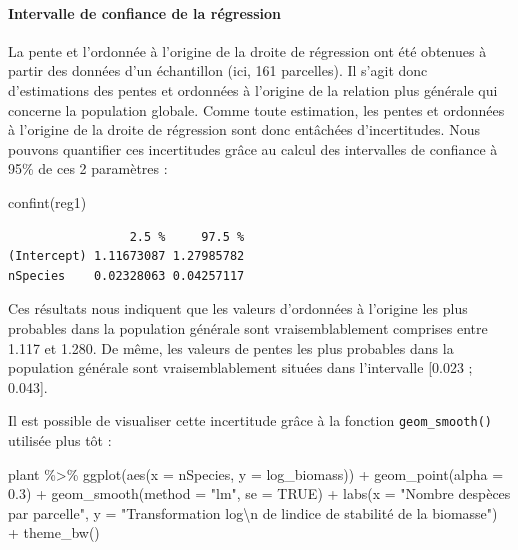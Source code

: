 \documentclass[
  a4paper,
]{article}
\newenvironment{Shaded}{\begin{snugshade}}{\end{snugshade}}
\newcommand{\AttributeTok}[1]{\textcolor[rgb]{0.00,0.34,0.68}{#1}}
\newcommand{\ConstantTok}[1]{\textcolor[rgb]{0.67,0.33,0.00}{#1}}
\newcommand{\FloatTok}[1]{\textcolor[rgb]{0.69,0.50,0.00}{#1}}
\newcommand{\FunctionTok}[1]{\textcolor[rgb]{0.39,0.29,0.61}{#1}}
\newcommand{\NormalTok}[1]{\textcolor[rgb]{0.12,0.11,0.11}{#1}}
\newcommand{\SpecialCharTok}[1]{\textcolor[rgb]{0.24,0.68,0.91}{#1}}
\newcommand{\StringTok}[1]{\textcolor[rgb]{0.75,0.01,0.01}{#1}}
\begin{document}
\hypertarget{intervalle-de-confiance-de-la-ruxe9gression}{%
\paragraph{Intervalle de confiance de la régression}\label{intervalle-de-confiance-de-la-ruxe9gression}}

La pente et l'ordonnée à l'origine de la droite de régression ont été obtenues à partir des données d'un échantillon (ici, 161 parcelles). Il s'agit donc d'estimations des pentes et ordonnées à l'origine de la relation plus générale qui concerne la population globale. Comme toute estimation, les pentes et ordonnées à l'origine de la droite de régression sont donc entâchées d'incertitudes. Nous pouvons quantifier ces incertitudes grâce au calcul des intervalles de confiance à 95\% de ces 2 paramètres :

\begin{Shaded}
\begin{Highlighting}[]
\FunctionTok{confint}\NormalTok{(reg1)}
\end{Highlighting}
\end{Shaded}

\begin{verbatim}
                 2.5 %     97.5 %
(Intercept) 1.11673087 1.27985782
nSpecies    0.02328063 0.04257117
\end{verbatim}

Ces résultats nous indiquent que les valeurs d'ordonnées à l'origine les plus probables dans la population générale sont vraisemblablement comprises entre 1.117 et 1.280. De même, les valeurs de pentes les plus probables dans la population générale sont vraisemblablement situées dans l'intervalle {[}0.023 ; 0.043{]}.

Il est possible de visualiser cette incertitude grâce à la fonction \texttt{geom\_smooth()} utilisée plus tôt :

\begin{Shaded}
\begin{Highlighting}[]
\NormalTok{plant }\SpecialCharTok{\%\textgreater{}\%} 
  \FunctionTok{ggplot}\NormalTok{(}\FunctionTok{aes}\NormalTok{(}\AttributeTok{x =}\NormalTok{ nSpecies, }\AttributeTok{y =}\NormalTok{ log\_biomass)) }\SpecialCharTok{+}
  \FunctionTok{geom\_point}\NormalTok{(}\AttributeTok{alpha =} \FloatTok{0.3}\NormalTok{) }\SpecialCharTok{+}
  \FunctionTok{geom\_smooth}\NormalTok{(}\AttributeTok{method =} \StringTok{"lm"}\NormalTok{, }\AttributeTok{se =} \ConstantTok{TRUE}\NormalTok{) }\SpecialCharTok{+}
  \FunctionTok{labs}\NormalTok{(}\AttributeTok{x =} \StringTok{"Nombre d\textquotesingle{}espèces par parcelle"}\NormalTok{,}
       \AttributeTok{y =} \StringTok{"Transformation log}\SpecialCharTok{\textbackslash{}n}\StringTok{ de l\textquotesingle{}indice de stabilité de la biomasse"}\NormalTok{) }\SpecialCharTok{+}
  \FunctionTok{theme\_bw}\NormalTok{()}
\end{Highlighting}
\end{Shaded}
\end{document}
